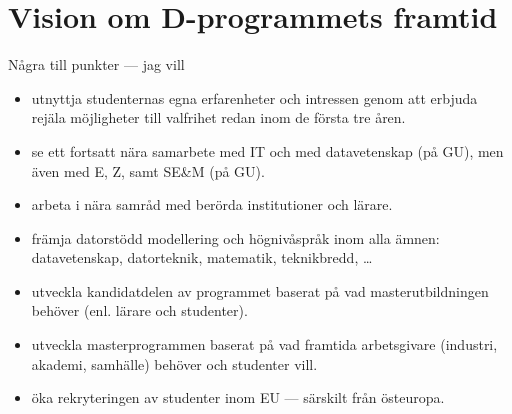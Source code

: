 \section{Vision om D-program\-mets framtid}

%
%
%

Några till punkter --- jag vill
\begin{itemize}
\item utnyttja studenternas egna erfarenheter och intressen genom att
  erbjuda rejäla möjligheter till valfrihet redan inom de första tre
  åren.
\item se ett fortsatt nära samarbete med IT och med datavetenskap (på
  GU), men även med E, Z, samt SE\&M (på GU).
\item arbeta i nära samråd med berörda institutioner och lärare.
\item främja datorstödd modellering och högnivåspråk inom alla ämnen:
  datavetenskap, datorteknik, mate\-matik, teknikbredd, \ldots
\item utveckla kandidatdelen av programmet baserat på vad
  masterutbildningen behöver (enl. lärare och studenter).
\item utveckla masterprogrammen baserat på vad framtida arbetsgivare
  (industri, akademi, samhälle) behöver och studenter vill.
\item öka rekryteringen av studenter inom EU --- särskilt från
  östeuropa.
\end{itemize}
